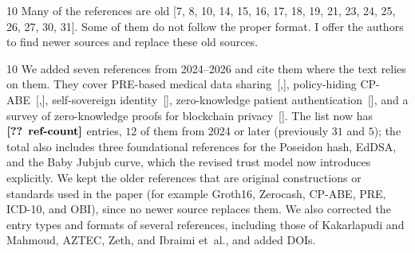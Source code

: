 \begin{reviewcomment}{10}
	Many of the references are old [7, 8, 10, 14, 15, 16, 17, 18, 19, 21, 23, 24, 25, 26, 27, 30, 31]. Some of them do not follow the proper format. I offer the authors to find newer sources and replace these old sources.
\end{reviewcomment}

\begin{reviewresponse}{10}
	We added seven references from 2024--2026 and cite them where the text relies on them.
	They cover PRE-based medical data sharing~[,], policy-hiding CP-ABE~[,], self-sovereign identity~[], zero-knowledge patient authentication~[], and a survey of zero-knowledge proofs for blockchain privacy~[].
	The list now has $\Loc{ref-count}$ entries, $12$ of them from 2024 or later (previously $31$ and $5$); the total also includes three foundational references for the Poseidon hash, EdDSA, and the Baby Jubjub curve, which the revised trust model now introduces explicitly.
	We kept the older references that are original constructions or standards used in the paper (for example Groth16, Zerocash, CP-ABE, PRE, ICD-10, and OBI), since no newer source replaces them.
	We also corrected the entry types and formats of several references, including those of Kakarlapudi and Mahmoud, AZTEC, Zeth, and Ibraimi et~al., and added DOIs.

\end{reviewresponse}
